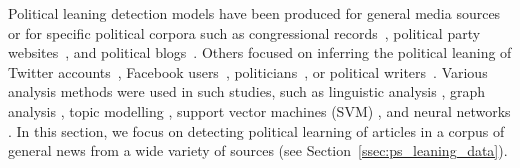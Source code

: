 Political leaning detection models have been produced for general media sources~\citep{budak} or for 
specific political corpora such as congressional records~\citep{gentzkow}, political party websites~\citep{yan2017perils}, and political blogs~\citep{ahmed201}.  
Others focused on inferring the political leaning of Twitter accounts~\citep{Cohen2013ClassifyingPO}, Facebook users~\citep{Bakshy1130}, politicians~\citep{thomas-etal-2006-get}, or political writers~\citep{iyyer-etal-2014-political}. 
Various analysis methods were used in such studies, such as linguistic analysis \citep{gentzkow}, graph analysis \citep{chen2017opinion}, topic modelling \citep{ahmed201,Cohen2013ClassifyingPO}, support vector machines (SVM) \citep{Bakshy1130,thomas-etal-2006-get}, and neural networks \citep{iyyer-etal-2014-political,baly2020we}.
In this section, we focus on detecting political learning of articles in a corpus of general news from a wide variety of sources (see Section~\ref{ssec:ps_leaning_data}). %



 

